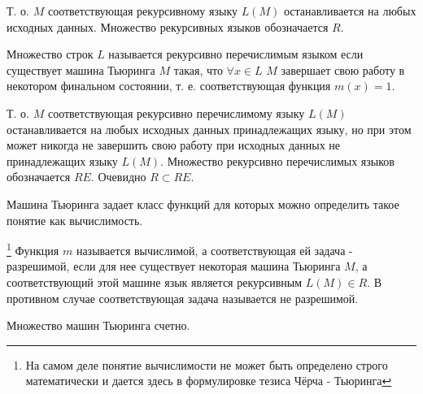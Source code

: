Т. о. $M$ соответствующая рекурсивному языку $L\left(M\right)$ 
останавливается на любых исходных данных. Множество рекурсивных языков
обозначается $R$.

\begin{definition} 
Множество строк $L$
называется рекурсивно перечислимым языком если существует машина Тьюринга $M$
такая, что $\forall x \in L$ $M$ завершает свою работу в некотором
финальном состоянии, т. е. соответствующая функция $m(x) = 1$. 
\end{definition}

Т. о. $M$ соответствующая рекурсивно перечислимому языку $L\left(M\right)$ 
останавливается на любых исходных данных принадлежащих языку, но при
этом может никогда не завершить свою работу при исходных данных не
принадлежащих языку $L\left(M\right)$. Множество рекурсивно
перечислимых языков обозначается $RE$. Очевидно  $R \subset RE$.

Машина Тьюринга задает класс функций для которых можно определить
такое понятие как вычислимость. 

\begin{definition}
\footnote{
На самом деле понятие вычислимости не может быть определено строго
математически и дается здесь в формулировке тезиса Чёрча - Тьюринга
}
Функция $m$ называется вычислимой, а соответствующая ей задача -
разрешимой, если для нее существует некоторая
машина Тьюринга $M$, а соответствующий этой машине язык является
рекурсивным $L\left(M\right) \in R$. В противном случае соответствующая
задача называется не разрешимой.
\end{definition}

\begin{theorem}
Множество машин Тьюринга счетно.
\label{theoremAddAlgoTuringCountability}
\end{theorem}

